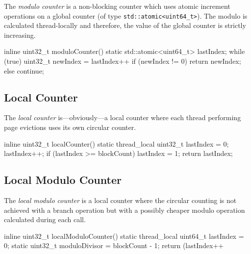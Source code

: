     The \emph{modulo counter} is a non-blocking counter which uses atomic increment operations on a global counter (of type \lstinline{std::atomic<uint64_t>}). The modulo is calculated thread-locally and therefore, the value of the global counter is strictly increasing.

\begin{@empty}
    \lstset{
        language = [ISO]C++
    }
\begin{centeredshadowboxlisting}
inline uint32_t moduloCounter() {
    static std::atomic<uint64_t> lastIndex;
    while (true) {
        uint32_t newIndex = lastIndex++
        if (newIndex != 0) {
            return newIndex;
        } else {
            continue;
        }
    }
}
\end{centeredshadowboxlisting}
\end{@empty}

\subsection[Local Counter]{Local Counter} \label{subsec:local_counter}

    The \emph{local counter} is---obviously---a local counter where each thread performing page evictions uses its own circular counter.

\begin{@empty}
    \lstset{
        language = [ISO]C++
    }
\begin{centeredshadowboxlisting}
inline uint32_t localCounter() {
    static thread_local uint32_t lastIndex = 0;
    lastIndex++;
    if (lastIndex >= blockCount) {
        lastIndex = 1;
    }
    return lastIndex;
}
\end{centeredshadowboxlisting}
\end{@empty}

\subsection[Local Modulo Counter]{Local Modulo Counter} \label{subsec:local_modulo_counter}

    The \emph{local modulo counter} is a local counter where the circular counting is not achieved with a branch operation but with a possibly cheaper modulo operation calculated during each call.

\begin{@empty}
    \lstset{
        language = [ISO]C++
    }
\begin{centeredshadowboxlisting}
inline uint32_t localModuloCounter() {
    static thread_local uint64_t lastIndex = 0;
    static uint32_t moduloDivisor = blockCount
                                  - 1;
    return (lastIndex++ %
}
\end{centeredshadowboxlisting}
\end{@empty}

